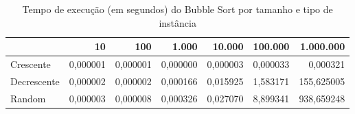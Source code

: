 \begin{table}[htbp]
    \centering
    \begin{tabular}{|l|r|r|r|r|r|r|}
        \hline
         & 10 & 100 & 1.000 & 10.000 & 100.000 & 1.000.000 \\
        \hline
        Crescente & 0,000001 & 0,000001 & 0,000000 & 0,000003 & 0,000033 & 0,000321 \\
        \hline
        Decrescente & 0,000002 & 0,000002 & 0,000166 & 0,015925 & 1,583171 & 155,625005 \\
        \hline
        Random & 0,000003 & 0,000008 & 0,000326 & 0,027070 & 8,899341 & 938,659248 \\
        \hline
    \end{tabular}
    \caption{Tempo de execução (em segundos) do Bubble Sort por tamanho e tipo de instância}
    \label{tab:tempos_bubble}
\end{table}
